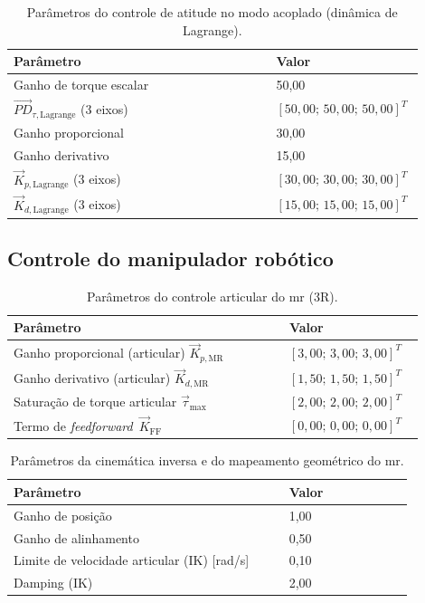 \begin{table}[H]
\centering
\caption{Parâmetros do controle de atitude no modo acoplado (dinâmica de Lagrange).}
\label{tab:apC_pd_lagrange}
\begin{tabular}{|p{0.62\linewidth}|p{0.28\linewidth}|}
\hline
\textbf{Parâmetro} & \textbf{Valor}\\
\hline
Ganho de torque escalar & 50,00\\
\hline
$\vec{PD}_{\tau,\text{Lagrange}}$ (3 eixos) & $[50,00;\,50,00;\,50,00]^T$\\
\hline
Ganho proporcional & 30,00\\
\hline
Ganho derivativo & 15,00\\
\hline
$\vec{K}_{p,\text{Lagrange}}$ (3 eixos) & $[30,00;\,30,00;\,30,00]^T$\\
\hline
$\vec{K}_{d,\text{Lagrange}}$ (3 eixos) & $[15,00;\,15,00;\,15,00]^T$\\
\hline
\end{tabular}
\end{table}

\subsection{Controle do manipulador robótico}
\label{apC:controle_mr}

\begin{table}[H]
\centering
\caption{Parâmetros do controle articular do \gls{mr} (3R).}
\label{tab:apC_controle_mr}
\begin{tabular}{|p{0.62\linewidth}|p{0.28\linewidth}|}
\hline
\textbf{Parâmetro} & \textbf{Valor}\\
\hline
Ganho proporcional (articular) $\vec{K}_{p,\text{MR}}$ & $[3,00;\,3,00;\,3,00]^T$\\
\hline
Ganho derivativo (articular) $\vec{K}_{d,\text{MR}}$ & $[1,50;\,1,50;\,1,50]^T$\\
\hline
Saturação de torque articular $\vec{\tau}_{\max}$ & $[2,00;\,2,00;\,2,00]^T$\\
\hline
Termo de \textit{feedforward} $\,\vec{K}_{\text{FF}}$ & $[0,00;\,0,00;\,0,00]^T$\\
\hline
\end{tabular}
\end{table}

\begin{table}[H]
\centering
\caption{Parâmetros da cinemática inversa e do mapeamento geométrico do \gls{mr}.}
\label{tab:apC_ik_mr}
\begin{tabular}{|p{0.62\linewidth}|p{0.28\linewidth}|}
\hline
\textbf{Parâmetro} & \textbf{Valor}\\
\hline
Ganho de posição & 1,00\\
\hline
Ganho de alinhamento & 0,50\\
\hline
Limite de velocidade articular (IK) [rad/s] & 0,10\\
\hline
Damping (IK) & 2,00\\
\hline
\end{tabular}
\end{table}

